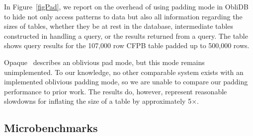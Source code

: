 \documentclass[letterpaper,twocolumn,10pt]{article}
\def\name/{ObliDB}
\begin{document}
In Figure~\ref{figPad}, we report on the overhead of using padding mode in \name/ to hide not only access patterns to data but also all information regarding the sizes of tables, whether they be at rest in the database, intermediate tables constructed in handling a query, or the results returned from a query. The table shows query results for the 107,000 row CFPB table padded up to 500,000 rows. 

Opaque~\cite{ZDB+17} describes an oblivious pad mode, but this mode remains unimplemented. To our knowledge, no other comparable system exists with an implemented oblivious padding mode, so we are unable to compare our padding performance to prior work. The results do, however, represent reasonable slowdowns for inflating the size of a table by approximately 5$\times$. 

\subsection{Microbenchmarks}
\end{document}
